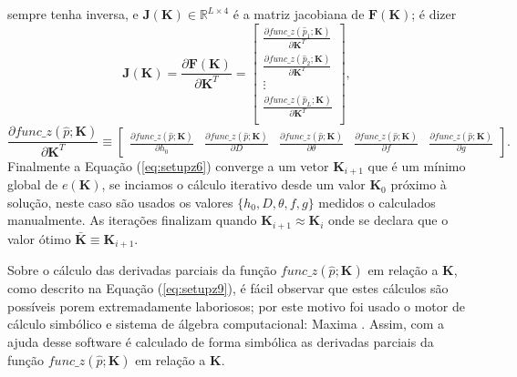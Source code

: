 \documentclass[12pt]{article}
\begin{document}
sempre tenha inversa, e 
 $\mathbf{J}(\mathbf{K})\in \mathbb{R}^{L\times 4}$ é a matriz jacobiana 
\cite[pp. 130]{zhang2017matrix} de $\mathbf{F}(\mathbf{K})$; é dizer
\begin{equation}
\mathbf{J}(\mathbf{K})=\frac{\partial \mathbf{F}(\mathbf{K})}{\partial \mathbf{K}^T}=
\begin{bmatrix}
\frac{\partial func\_z(\hat{p}_1;\mathbf{K})}{\partial \mathbf{K}^T}\\
\frac{\partial func\_z(\hat{p}_2;\mathbf{K})}{\partial \mathbf{K}^T}\\
\vdots\\
\frac{\partial func\_z(\hat{p}_L;\mathbf{K})}{\partial \mathbf{K}^T}\\
\end{bmatrix},
\end{equation}
\begin{equation}\label{eq:setupz9}
\frac{\partial func\_z(\hat{p};\mathbf{K})}{\partial \mathbf{K}^T}\equiv 
\begin{bmatrix}
\frac{\partial func\_z(\hat{p};\mathbf{K})}{\partial h_0} &
\frac{\partial func\_z(\hat{p};\mathbf{K})}{\partial D} &
\frac{\partial func\_z(\hat{p};\mathbf{K})}{\partial \theta} &
\frac{\partial func\_z(\hat{p};\mathbf{K})}{\partial f} &
\frac{\partial func\_z(\hat{p};\mathbf{K})}{\partial g}
\end{bmatrix}.
\end{equation}
Finalmente a Equação (\ref{eq:setupz6}) converge a um vetor $\mathbf{K}_{i+1}$ que é um mínimo global 
de $e\left(\mathbf{K}\right)$, se inciamos o cálculo iterativo desde 
um valor $\mathbf{K}_0$ próximo à solução, neste caso são usados os valores
$\{h_0,D,\theta,f,g\}$ medidos o calculados manualmente. 
As iterações finalizam quando $\mathbf{K}_{i+1}\approx \mathbf{K}_{i}$
onde se declara que o valor ótimo $\mathbf{\bar{K}}\equiv \mathbf{K}_{i+1}$.

Sobre o cálculo das derivadas parciais da função
$func\_z(\hat{p};\mathbf{K})$ em relação a $\mathbf{K}$, como
descrito na Equação (\ref{eq:setupz9}), é fácil observar que estes cálculos
são possíveis porem extremadamente laboriosos;
por este motivo foi usado o motor de cálculo simbólico  
e  sistema de álgebra computacional: Maxima \cite{santos2009introduccao}.
Assim, com a ajuda desse software é calculado de forma simbólica
as derivadas parciais da função $func\_z(\hat{p};\mathbf{K})$ em relação a $\mathbf{K}$.
\end{document}
